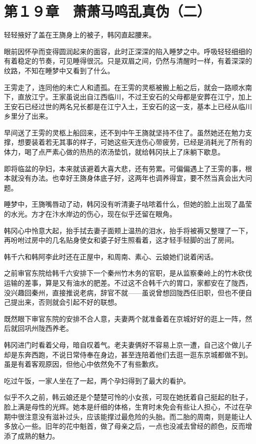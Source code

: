 \section{第１９章　萧萧马鸣乱真伪（二）}

轻轻掖好了盖在王旖身上的被子，韩冈直起腰来。

眼前因怀孕而变得圆润起来的面容，此时正深深的陷入睡梦之中。呼吸轻轻细细的有着稳定的节奏，可见睡得很沉。只是双眉之间，仍然与清醒时一样，有着深深的纹路，不知在睡梦中又看到了什么。

王雱走了，连同他的未亡人和遗孤。在王雱的灵柩被搬上船之后，就会一路顺水南下，直放江宁。王家虽说出自江西临川，不过王安石的父母都是安葬在江宁，加上王安石已经过世的两名兄长都是在江宁入土，王安石的这一支，基本上已经从临川乡里分了出来。

早间送了王雱的灵柩上船回来，还不到中午王旖就坚持不住了。虽然她还在勉力支撑，想要装着若无其事的样子，可她这些天连伤心带疲劳，已经是消耗光了所有的体力，喝了点严素心做的热热的浓汤垫饥，就给韩冈扶上了床躺下歇息。

即将临盆的孕妇，本来就该避着大喜大悲，还有劳累。可偏偏遇上了王雱的事，根本就没有办法。也幸好王旖身体底子好，这两年也调养得宜，要不然当真会出大问题。

睡梦中，王旖嘴唇动了动，韩冈没有听清妻子咕哝着什么，但她的脸上出现了晶莹的水光。方才在汴水岸边的伤心，现在似乎还留在眼角。

韩冈心中怜意大起，抬手拭去妻子面颊上温热的泪水，抬手将被褥又整理了一下，再吩咐过房中的几名贴身使女和婆子好生照看着，这才轻手轻脚的出了房间。

韩千六和韩阿李此时还在正屋中，和周南、素心、云娘她们说着闲话。

之前审官东院给韩千六安排下一个秦州竹木务的官职，是从监察秦岭上的竹木砍伐运输的差事，算是又有油水的肥差。不过这不合韩千六的胃口，家都安在了陇西，没兴趣回秦州，直接推说老病，辞官不就——虽说曾想回陇西任旧职，但也不便自己提出来，否则就会引起不好的联想。

既然眼下审官东院的安排不合人意，夫妻两个就准备着在京城好好的逛上一阵，然后就回巩州陇西养老。

韩冈进门时看着父母，暗自叹着气。老夫妻俩好不容易上京一遭，自己这个做儿子却是东奔西跑，不说日常侍奉在身边，甚至连陪着他们去逛一逛东京城都做不到。虽是有着客观原因，但他心中依然免不了有些歉疚。

吃过午饭，一家人坐在了一起，两个孕妇得到了最大的看护。

似乎不久之前，韩云娘还是个楚楚可怜的小女孩，可现在她抚着自己挺起的肚子，脸上满是母性的光辉。她本是纤细的体格，生育时未免会有些让人担心，不过在孕期中很注意没有滋补过头，应该能撑过最危险的头胎。而二胎的周南，则是能让人多放心一些。旧年的花中魁首，做了母亲之后，一点也没减去曾经的颜色，反而增添了成熟的魅力。

